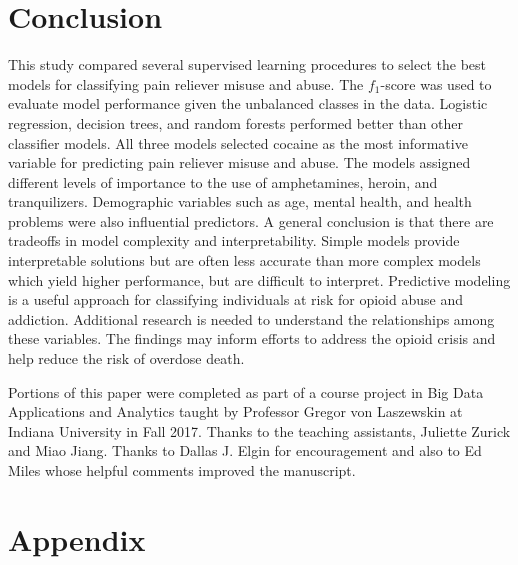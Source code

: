 \documentclass[sigconf]{acmart}
\begin{document}
\section{Conclusion}

This study compared several supervised learning procedures to select the best 
models for classifying pain reliever misuse and abuse. The $f_1$-score was 
used to evaluate model performance given the unbalanced classes in the data. 
Logistic regression, decision trees, and random forests performed better than
other classifier models. All three models selected cocaine as the most 
informative variable for predicting pain reliever misuse and abuse. The
models assigned different levels of importance to the use of amphetamines, 
heroin, and tranquilizers. Demographic variables such as age, mental health, 
and health problems were also influential predictors. A general conclusion is 
that there are tradeoffs in model complexity and interpretability. Simple
models provide interpretable solutions but are often less accurate than more 
complex models which yield higher performance, but are difficult to interpret. 
Predictive modeling is a useful approach for classifying individuals at risk 
for opioid abuse and addiction. Additional research is needed to understand 
the relationships among these variables. The findings may inform efforts to 
address the opioid crisis and help reduce the risk of overdose death. 

\begin{acks}

Portions of this paper were completed as part of a course project in Big Data 
Applications and Analytics taught by Professor Gregor von Laszewskin at 
Indiana University in Fall 2017. Thanks to the teaching assistants, Juliette 
Zurick and Miao Jiang. Thanks to Dallas J. Elgin for encouragement and also
to Ed Miles whose helpful comments improved the manuscript. 

\end{acks}

 

\appendix

\section{Appendix}
\end{document}
